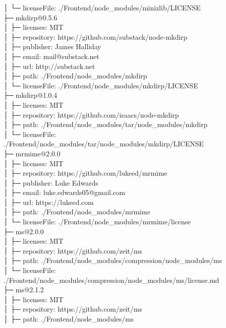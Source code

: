 \documentclass[
    paper=a4,
    twoside=false,
    parskip=half,
    listof=entryprefix,
    listof=totoc,
    index=totoc,
    bibliography=totoc,
    headsepline,
]{scrbook}
\begin{document}
    │  └─ licenseFile: ./Frontend/node\_modules/minizlib/LICENSE\\
    ├─ mkdirp@0.5.6\\
    │  ├─ licenses: MIT\\
    │  ├─ repository: https://github.com/substack/node-mkdirp\\
    │  ├─ publisher: James Halliday\\
    │  ├─ email: mail@substack.net\\
    │  ├─ url: http://substack.net\\
    │  ├─ path: ./Frontend/node\_modules/mkdirp\\
    │  └─ licenseFile: ./Frontend/node\_modules/mkdirp/LICENSE\\
    ├─ mkdirp@1.0.4\\
    │  ├─ licenses: MIT\\
    │  ├─ repository: https://github.com/isaacs/node-mkdirp\\
    │  ├─ path: ./Frontend/node\_modules/tar/node\_modules/mkdirp\\
    │  └─ licenseFile: ./Frontend/node\_modules/tar/node\_modules/mkdirp/LICENSE\\
    ├─ mrmime@2.0.0\\
    │  ├─ licenses: MIT\\
    │  ├─ repository: https://github.com/lukeed/mrmime\\
    │  ├─ publisher: Luke Edwards\\
    │  ├─ email: luke.edwards05@gmail.com\\
    │  ├─ url: https://lukeed.com\\
    │  ├─ path: ./Frontend/node\_modules/mrmime\\
    │  └─ licenseFile: ./Frontend/node\_modules/mrmime/license\\
    ├─ ms@2.0.0\\
    │  ├─ licenses: MIT\\
    │  ├─ repository: https://github.com/zeit/ms\\
    │  ├─ path: ./Frontend/node\_modules/compression/node\_modules/ms\\
    │  └─ licenseFile: ./Frontend/node\_modules/compression/node\_modules/ms/license.md\\
    ├─ ms@2.1.2\\
    │  ├─ licenses: MIT\\
    │  ├─ repository: https://github.com/zeit/ms\\
    │  ├─ path: ./Frontend/node\_modules/ms\\
\end{document}
